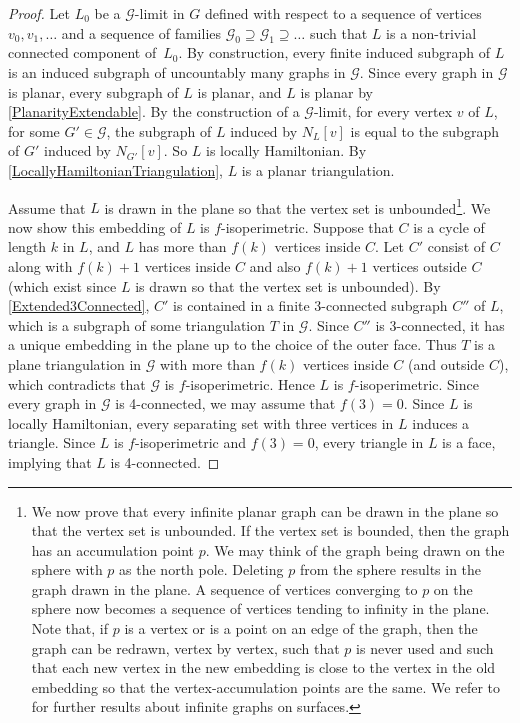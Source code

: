 \documentclass[a4paper,11pt]{article}
\theoremstyle{plain}
\theoremstyle{definition}
\newcommand{\GG}{\mathcal{G}}
\begin{document}
\begin{proof}
Let $L_0$ be a $\GG$-limit in $G$ defined with respect to a sequence of vertices $v_0,v_1,\dots$ and a sequence of families $\GG_0 \supseteq \GG_1\supseteq \dots$ such that $L$ is a non-trivial connected component of~$L_0$. By construction, every finite induced subgraph of $L$ is an induced subgraph of uncountably many graphs in $\GG$. 
Since every graph in $\GG$ is planar, every subgraph of $L$ is planar, and $L$ is planar by \cref{PlanarityExtendable}. By the construction of a $\GG$-limit, for every vertex $v$ of $L$, for some $G'\in\GG$, the subgraph of $L$ induced by $N_L[v]$ is equal to the subgraph of $G'$ induced by $N_{G'}[v]$. So $L$ is locally Hamiltonian. By \cref{LocallyHamiltonianTriangulation}, $L$ is a planar triangulation. 

Assume that $L$ is drawn in the plane so that the vertex set is unbounded\footnote{We now prove that every infinite planar graph can be drawn in the plane so that the vertex set is unbounded. If the vertex set is bounded, then the graph has an accumulation point $p$. We may think of the graph being drawn on the sphere with $p$ as the north pole. Deleting $p$ from the sphere results in the graph drawn in the plane. A sequence of vertices converging to $p$ on the sphere now becomes a sequence of vertices tending to infinity in the plane. Note that, if $p$ is a vertex or is a point on an edge of the graph, then the graph can be redrawn, vertex by vertex, such that $p$ is never used and such that each new vertex in the new embedding is close to the vertex in the old embedding so that the vertex-accumulation points are the same. We refer to \cite{Mo88} for further results about infinite graphs on surfaces.}. We now show this embedding of $L$ is $f$-isoperimetric. Suppose that $C$ is a cycle of length $k$ in $L$, and $L$ has more than $f(k)$ vertices inside $C$. 
Let $C'$ consist of $C$ along with $f(k)+1$ vertices inside $C$ and also $f(k)+1$ vertices outside $C$ (which exist since $L$ is drawn so that the vertex set is unbounded). By \cref{Extended3Connected}, $C'$ is contained in a finite 3-connected subgraph $C''$ of $L$, which is a subgraph of some triangulation $T$ in $\GG$. Since $C''$ is 3-connected, it has a unique embedding in the plane up to the choice of the outer face. Thus $T$ is a plane triangulation in $\GG$ with more than $f(k)$ vertices inside $C$ (and outside $C$), which contradicts that $\GG$ is $f$-isoperimetric. Hence $L$ is $f$-isoperimetric. Since every graph in $\GG$ is 4-connected, we may assume that $f(3)=0$. Since $L$ is locally Hamiltonian, every separating set with three vertices in $L$ induces a triangle. Since $L$ is $f$-isoperimetric and $f(3)=0$, every triangle in $L$ is a face, implying that $L$ is 4-connected.


\end{proof}
\end{document}

